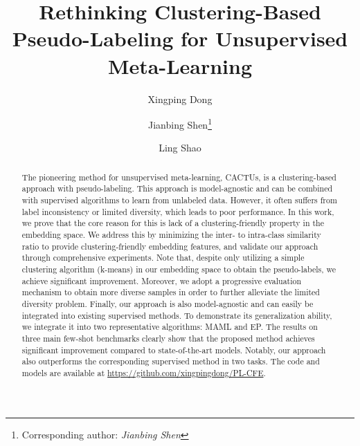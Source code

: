 \documentclass[runningheads]{llncs}
\begin{document}
\pagestyle{headings}
\mainmatter
\def\ECCVSubNumber{3487}  

\title{Rethinking Clustering-Based Pseudo-Labeling for Unsupervised Meta-Learning} 

\begin{comment}
\titlerunning{ECCV-22 submission ID \ECCVSubNumber} 
\authorrunning{ECCV-22 submission ID \ECCVSubNumber} 
\author{Anonymous ECCV submission}
\institute{Paper ID \ECCVSubNumber}
\end{comment}


\author{Xingping Dong \and
Jianbing Shen\thanks{Corresponding author: \textit{Jianbing Shen}} \and
Ling Shao}
\maketitle


\begin{abstract}
The pioneering method for unsupervised meta-learning, CACTUs, is a clustering-based approach with pseudo-labeling. This approach is model-agnostic and can be combined with supervised algorithms to learn from unlabeled data. However, it often suffers from label inconsistency or limited diversity, which leads to poor performance. In this work, we prove that the core reason for this is lack of a clustering-friendly property in the embedding space. We address this by minimizing the inter- to intra-class similarity ratio to provide clustering-friendly embedding features, and validate our approach through comprehensive experiments. Note that, despite only utilizing a simple clustering algorithm (k-means) in our embedding space to obtain the pseudo-labels, we achieve significant improvement. Moreover, we adopt a progressive evaluation mechanism to obtain more diverse samples in order to further alleviate the limited diversity problem. Finally, our approach is also model-agnostic and can easily be integrated into existing supervised methods. To demonstrate its generalization ability, we integrate it into two representative algorithms: MAML and EP. The results on three main few-shot benchmarks clearly show that the proposed method achieves significant improvement compared to state-of-the-art models. Notably, our approach also outperforms the corresponding supervised method in two tasks.
The code and models are available at \url{https://github.com/xingpingdong/PL-CFE}.

\end{abstract}
\end{document}
